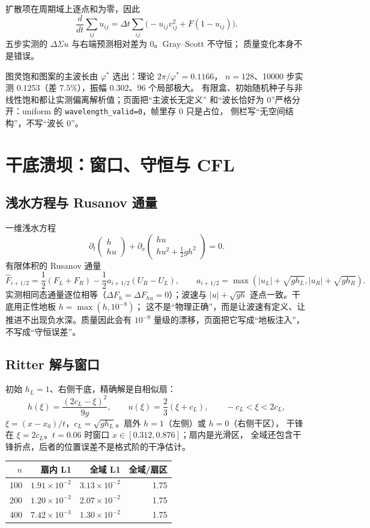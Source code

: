 扩散项在周期域上逐点和为零，因此
\[
  \frac{d}{dt}\sum_{ij}u_{ij}=\Delta t\sum_{ij}
  \bigl(-u_{ij}v_{ij}^2+F(1-u_{ij})\bigr).
\]
五步实测的 $\Delta\Sigma u$ 与右端预测相对差为 $0$。Gray--Scott 不守恒；
质量变化本身不是错误。

图灵饱和图案的主波长由 $\varphi^\ast$ 选出：理论 $2\pi/\varphi^\ast=0.1166$，
$n=128$、10000 步实测 $0.1253$（差 $7.5\%$），振幅 $0.302$、96 个局部极大。
有限盒、初始随机种子与非线性饱和都让实测偏离解析值；页面把“主波长无定义”
和“波长恰好为 0”严格分开：uniform 的 \texttt{wavelength\_valid=0}，帧里存 0 只是占位，
侧栏写“无空间结构”，不写“波长 0”。

\section{干底溃坝：窗口、守恒与 CFL}\label{sec:dam}

\subsection{浅水方程与 Rusanov 通量}

一维浅水方程
\[
  \partial_t\begin{pmatrix}h\\hu\end{pmatrix}
  +\partial_x\begin{pmatrix}hu\\hu^2+\tfrac12gh^2\end{pmatrix}=0 .
\]
有限体积的 Rusanov 通量
\[
  \hat F_{i+1/2}=\frac12(F_L+F_R)-\frac12 a_{i+1/2}(U_R-U_L),
  \qquad a_{i+1/2}=\max(|u_L|+\sqrt{gh_L},|u_R|+\sqrt{gh_R}).
\]
实测相同态通量逐位相等（$\Delta F_h=\Delta F_{hu}=0$）；波速与
$|u|+\sqrt{gh}$ 逐点一致。干底用正性地板 $h=\max(h,10^{-8})$；
这不是“物理正确”，而是让波速有定义、让推进不出现负水深。质量因此会有
$10^{-9}$ 量级的漂移，页面把它写成“地板注入”，不写成“守恒误差”。

\subsection{Ritter 解与窗口}

初始 $h_L=1$、右侧干底，精确解是自相似扇：
\[
  h(\xi)=\frac{(2c_L-\xi)^2}{9g},\qquad
  u(\xi)=\frac23(\xi+c_L),\qquad -c_L<\xi<2c_L,
\]
$\xi=(x-x_0)/t$，$c_L=\sqrt{gh_L}$。扇外 $h=1$（左侧）或 $h=0$（右侧干区），
干锋在 $\xi=2c_L$。$t=0.06$ 时窗口 $x\in[0.312,0.876]$；扇内是光滑区，
全域还包含干锋折点，后者的位置误差不是格式阶的干净估计。

\begin{center}
\begin{tabular}{rrrr}
\toprule
$n$ & 扇内 L1 & 全域 L1 & 全域/扇区 \\
\midrule
100 & $1.91\times10^{-2}$ & $3.13\times10^{-2}$ & 1.75 \\
200 & $1.20\times10^{-2}$ & $2.07\times10^{-2}$ & 1.75 \\
400 & $7.42\times10^{-3}$ & $1.30\times10^{-2}$ & 1.75 \\
\bottomrule
\end{tabular}
\end{center}

